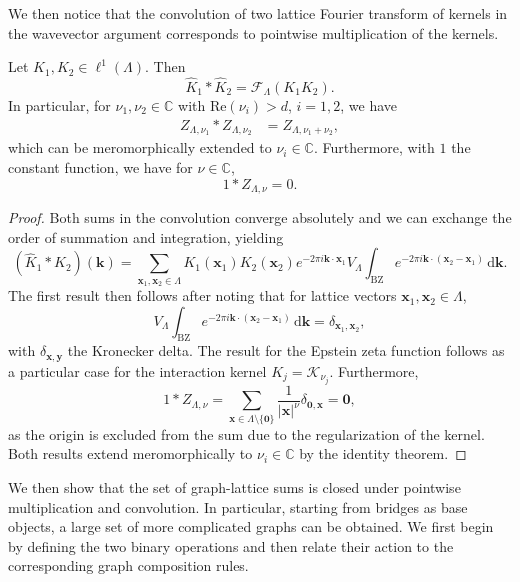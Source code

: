 \documentclass[]{amsart}
\numberwithin{mythm}{section}
\begin{document}
We then notice that the convolution of two lattice Fourier transform of kernels in the wavevector argument corresponds to pointwise multiplication of the kernels.
\begin{corollary}
\label{cor:convolution}
Let $K_1,K_2\in\ell^1(\Lambda)$. Then
\[
\hat K_1\ast \hat K_2 = \mathcal F_\Lambda (K_1 K_2).
\]
    In particular, for $\nu_1,\nu_2\in \mathds C$ with $\mathrm{Re}(\nu_i)>d$, $i=1,2$, we have
    \begin{align*}
    Z_{\Lambda,\nu_1}\ast Z_{\Lambda,\nu_2} &= Z_{\Lambda,\nu_1+\nu_2},
    \end{align*}
    which can be meromorphically extended to $\nu_i\in \mathds C$.
    Furthermore, with $1$ the constant function, we have for $\nu\in \mathds C$,
    \[
        1\ast Z_{\Lambda,\nu}=0.
    \]
\end{corollary}
\begin{proof}
    Both sums in the convolution converge absolutely and we can exchange the order of summation and integration, yielding
    \[
    (\hat K_1\ast \hat K_2)(\bm k)=\sum_{\bm x_1,\bm x_2\in \Lambda}K_1( \bm x_1)K_2(\bm x_2) e^{-2\pi i \bm k\cdot \bm x_1} V_\Lambda \int_{\mathrm{BZ}} e^{-2\pi i \bm k\cdot(\bm x_2-\bm x_1)}\,\mathrm d \bm k.
    \]
    The first result then follows after noting that for lattice vectors $\bm x_1,\bm x_2\in \Lambda$,
    \[
    V_\Lambda \int_{\mathrm{BZ}} e^{-2\pi i \bm k\cdot(\bm x_2-\bm x_1)}\,\mathrm d \bm k = \delta_{\bm x_1,\bm x_2},
    \]
    with $\delta_{\bm x,\bm y}$ the Kronecker delta. The result for the Epstein zeta function follows as a particular case for the interaction kernel $K_j=\mathcal K_{\nu_j}$. Furthermore,
    \[
     1\ast Z_{\Lambda,\nu} = \sum_{\bm x\in \Lambda\setminus\{\bm 0\}} \frac{1}{\vert \bm x\vert^\nu} \delta_{\bm 0,\bm x} = \bm 0,
    \]
    as the origin is excluded from the sum due to the regularization of the kernel. Both results extend meromorphically to $\nu_i\in \mathds C$ by the identity theorem.
\end{proof}

We then show that the set of graph-lattice sums is closed under pointwise multiplication and convolution. In particular, starting from bridges as base objects, a large set of more complicated graphs can be obtained. We first begin by defining the two binary operations and then relate their action to the corresponding graph composition rules.
\end{document}
